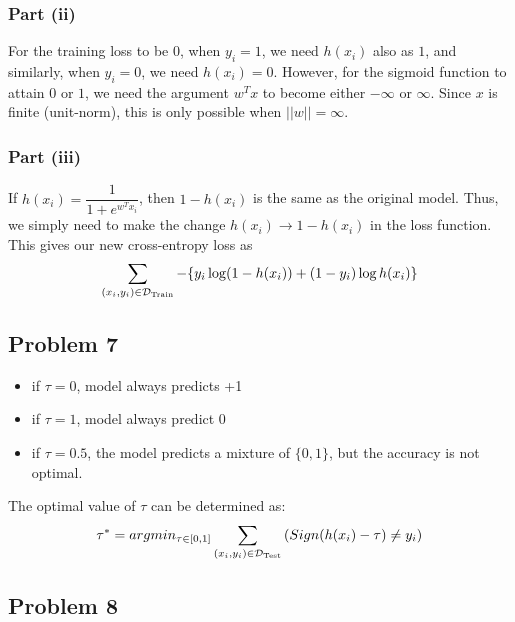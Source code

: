 \documentclass[12pt]{article}
\begin{document}
\subsubsection{Part (ii)}

For the training loss to be $0$, when $y_i = 1$, we need $h(x_i)$ also as $1$, and similarly, when $y_i = 0$, we need $h(x_i) = 0$. However, for the sigmoid function to attain $0$ or $1$, we need the argument $w^Tx$ to become either $-\infty$ or $\infty$. Since $x$ is finite (unit-norm), this is only possible when $||w||=\infty$.

\subsubsection{Part (iii)}

If $h(x_i) = \dfrac{1}{1+e^{w^Tx_i}}$, then $1-h(x_i)$ is the same as the original model. Thus, we simply need to make the change $h(x_i) \longrightarrow 1-h(x_i)$ in the loss function. This gives our new cross-entropy loss as $$\sum_{(x_i, y_i) \in {\cal D}_{\textrm{Train}}} - \{y_i \log(1-h(x_i)) + (1-y_i) \log h(x_i) \}$$


\subsection{Problem 7}

\begin{itemize}
    \item if $\tau = 0$, model always predicts +1
    \item if $\tau = 1$, model always predict  0
    \item if $\tau = 0.5$, the model predicts a mixture of $\{0,1\}$, but the accuracy is not optimal.
    
\end{itemize}
The optimal value of $\tau$ can be determined as:
\begin{align*}
    \tau^* = argmin _{\tau \in [0,1] } \sum_{(x_i, y_i) \in {\cal D}_{\textrm{Test}}}  {(Sign(h(x_i)-\tau)\neq y_i)}
\end{align*}

\subsection{Problem 8}
\end{document}
